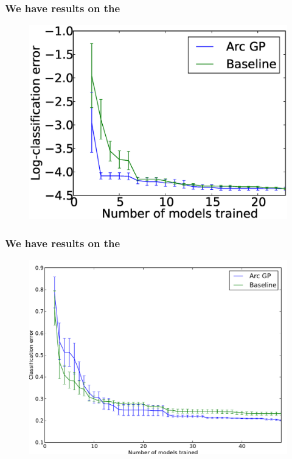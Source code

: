 \documentclass[12pt,onlymath]{beamer}
\begin{document}
\begin{frame}\frametitle{We have results on the }
\begin{figure}[t!]
	\centering
		\includegraphics[width=0.9\columnwidth]{figures/mnist}
		\label{fig:mnist}
\end{figure}


\end{frame}
\begin{frame}\frametitle{We have results on the }


\begin{figure}[t!]
	\centering
		\includegraphics[width=0.9\columnwidth]{figures/cifar10}
		\label{fig:cifar10}
\end{figure}


\end{frame}
\end{document}
